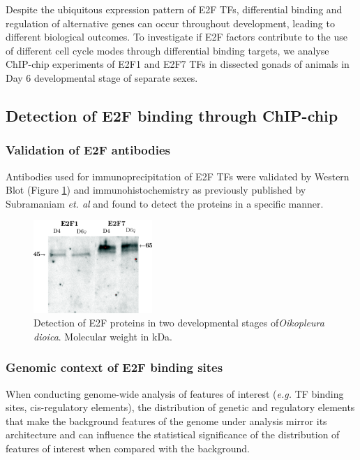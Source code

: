 \documentclass[11pt,twoside,a4paper]{report}
\begin{document}
	Despite the ubiquitous expression pattern of E2F TFs, differential binding and regulation of alternative genes can occur throughout development, leading to different biological outcomes. To investigate if E2F factors contribute to the use of different cell cycle modes through differential binding targets, we analyse ChIP-chip experiments of E2F1 and E2F7 TFs in dissected gonads of animals in Day 6 developmental stage of separate sexes.

	\subsection{Detection of E2F binding through ChIP-chip}
		\subsubsection{Validation of E2F antibodies}
		Antibodies used for immunoprecipitation of E2F TFs were validated by Western Blot (Figure \ref{fig:E2F_westerns}) and immunohistochemistry as previously published by Subramaniam \textit{et. al} \cite{Subramaniam2014} and found to detect the proteins in a specific manner.
		
		\begin{figure}[here]
			\setlength{\belowcaptionskip}{5pt}
			\centering
			\includegraphics[width=0.4\textwidth]{pngs/E2Fs_western.png}
			\caption[Detection of E2F proteins in two developmental stages of\textit{Oikopleura}]
			{Detection of E2F proteins in two developmental stages of\textit{Oikopleura dioica}.
				{\footnotesize 
					Molecular weight in kDa.
				}
			}
			\label{fig:E2F_westerns}
		\end{figure}
	
		\subsubsection{Genomic context of E2F binding sites}
		When conducting genome-wide analysis of features of interest (\textit{e.g.} TF binding sites, cis-regulatory elements), the distribution of genetic and regulatory elements that make the background features of the genome under analysis mirror its architecture and can influence the statistical significance of the distribution of features of interest when compared with the background.
		
\end{document}
